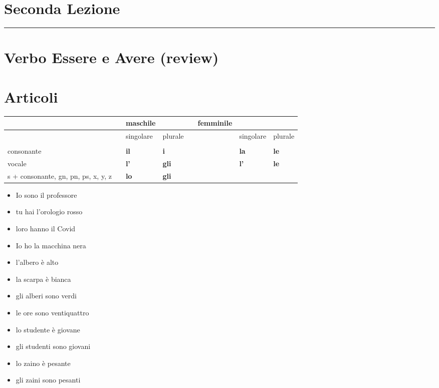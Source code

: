 \documentclass[letter,11pt]{article}
\begin{document}
\section*{\Large{Seconda Lezione}}
\noindent\rule{16cm}{1pt}

\section*{Verbo Essere e Avere (review)}

\section*{Articoli}


\begin{tabular}{ |p{2cm}|  p{0.2cm}| p{2cm}| p{2cm}| p{0.2cm}| p{2cm}| p{2cm}| p{2cm}| }
      &  & {\bf maschile} & & & {\bf femminile} & & \\
    \hline
      &  & singolare & plurale & & & singolare & plurale \\
    \hline
    \hline
     &  &  & & &  & & \\ \hline
    consonante &  & {\bf il} & {\bf i} & & & {\bf la}  & {\bf le} \\ \hline
    vocale & & {\bf l'} & {\bf gli} & & & {\bf l'}  & {\bf le} \\ \hline
    s + consonante, gn, pn, ps, x, y, z & & {\bf lo} & {\bf gli} &   \\
    \hline
    \hline
\end{tabular}

\vskip 0.5in
\begin{multicols}{2}
\begin{itemize}
    \item Io sono il professore
    \item tu hai l'orologio rosso
    \item loro hanno il Covid
    \item Io ho la macchina nera
    \item l'albero è alto
    \item la scarpa è bianca
    \item gli alberi sono verdi
    \item le ore sono ventiquattro
    \item lo studente è giovane
    \item gli studenti sono giovani
    \item lo zaino è pesante
    \item gli zaini sono pesanti

\end{itemize}
\end{multicols}
\end{document}
